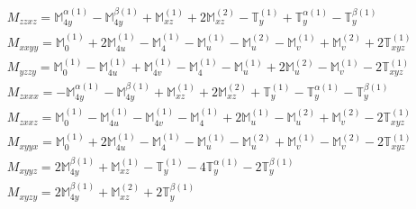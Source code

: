 \documentclass[fleqn,8pt,landscape]{jsarticle}
\begin{document}
\begin{align*}
& M_{zzxz} = \mathbb{M}_{4y}^{\alpha(1)} - \mathbb{M}_{4y}^{\beta(1)} + \mathbb{M}_{xz}^{(1)} + 2 \mathbb{M}_{xz}^{(2)} - \mathbb{T}_{y}^{(1)} + \mathbb{T}_{y}^{\alpha(1)} - \mathbb{T}_{y}^{\beta(1)} \\
& M_{xxyy} = \mathbb{M}_{0}^{(1)} + 2 \mathbb{M}_{4u}^{(1)} - \mathbb{M}_{4}^{(1)} - \mathbb{M}_{u}^{(1)} - \mathbb{M}_{u}^{(2)} - \mathbb{M}_{v}^{(1)} + \mathbb{M}_{v}^{(2)} + 2 \mathbb{T}_{xyz}^{(1)} \\
& M_{yzzy} = \mathbb{M}_{0}^{(1)} - \mathbb{M}_{4u}^{(1)} + \mathbb{M}_{4v}^{(1)} - \mathbb{M}_{4}^{(1)} - \mathbb{M}_{u}^{(1)} + 2 \mathbb{M}_{u}^{(2)} - \mathbb{M}_{v}^{(1)} - 2 \mathbb{T}_{xyz}^{(1)} \\
& M_{zxxx} = - \mathbb{M}_{4y}^{\alpha(1)} - \mathbb{M}_{4y}^{\beta(1)} + \mathbb{M}_{xz}^{(1)} + 2 \mathbb{M}_{xz}^{(2)} + \mathbb{T}_{y}^{(1)} - \mathbb{T}_{y}^{\alpha(1)} - \mathbb{T}_{y}^{\beta(1)} \\
& M_{zxxz} = \mathbb{M}_{0}^{(1)} - \mathbb{M}_{4u}^{(1)} - \mathbb{M}_{4v}^{(1)} - \mathbb{M}_{4}^{(1)} + 2 \mathbb{M}_{u}^{(1)} - \mathbb{M}_{u}^{(2)} + \mathbb{M}_{v}^{(2)} - 2 \mathbb{T}_{xyz}^{(1)} \\
& M_{xyyx} = \mathbb{M}_{0}^{(1)} + 2 \mathbb{M}_{4u}^{(1)} - \mathbb{M}_{4}^{(1)} - \mathbb{M}_{u}^{(1)} - \mathbb{M}_{u}^{(2)} + \mathbb{M}_{v}^{(1)} - \mathbb{M}_{v}^{(2)} - 2 \mathbb{T}_{xyz}^{(1)} \\
& M_{xyyz} = 2 \mathbb{M}_{4y}^{\beta(1)} + \mathbb{M}_{xz}^{(1)} - \mathbb{T}_{y}^{(1)} - 4 \mathbb{T}_{y}^{\alpha(1)} - 2 \mathbb{T}_{y}^{\beta(1)} \\
& M_{xyzy} = 2 \mathbb{M}_{4y}^{\beta(1)} + \mathbb{M}_{xz}^{(2)} + 2 \mathbb{T}_{y}^{\beta(1)}
\end{align*}
\end{document}
